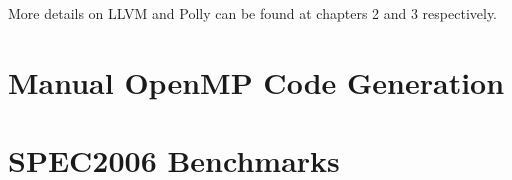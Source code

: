 \documentclass[a4paper,12pt]{article}
\begin{document}
More details on LLVM and Polly can be found at chapters 2 and 3 respectively.

\section{Manual OpenMP Code Generation}

\section{SPEC2006 Benchmarks}
\end{document}
